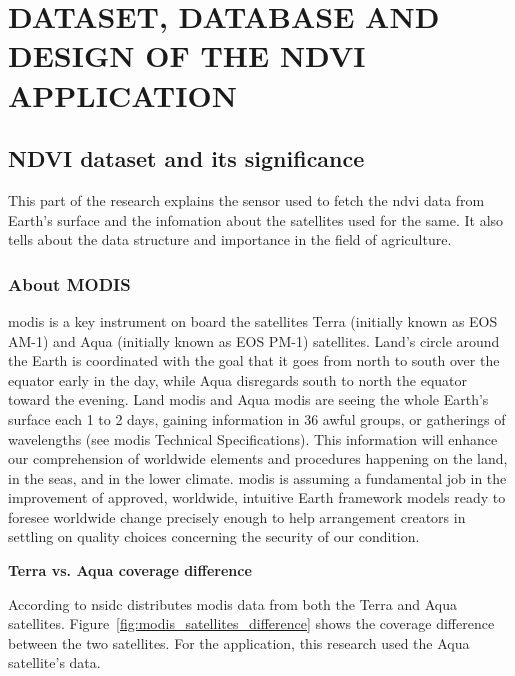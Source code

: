 \chapter{DATASET, DATABASE AND DESIGN OF THE NDVI APPLICATION}
\label{chap:dataset & database}

\section{NDVI dataset and its significance}

This part of the research explains the sensor used to fetch the \gls{ndvi} data from Earth's surface and the infomation about the satellites used for the same. It also tells about the data structure and importance in the field of agriculture.

\subsection{About MODIS}

\newcommand{\MYhref}[3][blue]{\href{#2}{\color{#1}{#3}}}%

\gls{modis} is a key instrument on board the satellites Terra (initially known as EOS AM-1) and Aqua (initially known as EOS PM-1) satellites. Land's circle around the Earth is coordinated with the goal that it goes from north to south over the equator early in the day, while Aqua disregards south to north the equator toward the evening. Land \gls{modis} and Aqua \gls{modis} are seeing the whole Earth's surface each 1 to 2 days, gaining information in 36 awful groups, or gatherings of wavelengths (see \gls{modis} Technical Specifications). This information will enhance our comprehension of worldwide elements and procedures happening on the land, in the seas, and in the lower climate. \gls{modis} is assuming a fundamental job in the improvement of approved, worldwide, intuitive Earth framework models ready to foresee worldwide change precisely enough to help arrangement creators in settling on quality choices concerning the security of our condition. \cite{MODIS} \\
\centerline{\textbf{Terra vs. Aqua coverage difference}}
According to \gls{nsidc} distributes \gls{modis} data from both the Terra and Aqua satellites. Figure~\ref{fig:modis_satellites_difference} shows the coverage difference between the two satellites. For the application, this research used the Aqua satellite's data.

